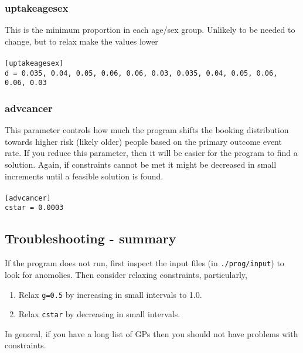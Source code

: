 \documentclass[a4paper]{article}
\begin{document}
\subsubsection{uptakeagesex}

This is the minimum proportion in each age/sex group. Unlikely to be needed to change, but to relax make the values lower\\
\\ \texttt{[uptakeagesex] \\ d = 0.035, 0.04, 0.05, 0.06, 0.06, 0.03, 0.035, 0.04, 0.05, 0.06, 0.06, 0.03}

\subsubsection{advcancer}

This parameter controls how much the program shifts the booking distribution towards higher risk (likely older) people based on the primary outcome event rate. If you reduce this parameter, then it will be easier for the program to find a solution. Again, if constraints cannot be met it might be decreased in small increments until a feasible solution is found.\\
\\ \texttt{[advcancer]\\
cstar = 0.0003}

\subsection{Troubleshooting - summary}

If the program does not run, first inspect the input files (in \texttt{./prog/input}) to look for anomolies. Then consider relaxing constraints, particularly,
\begin{enumerate}
	\item Relax \texttt{g=0.5} by increasing in small intervals to 1.0.
	\item Relax \texttt{cstar} by decreasing in small intervals.
\end{enumerate}
In general, if you have a long list of GPs then you should not have problems with constraints.
\end{document}
